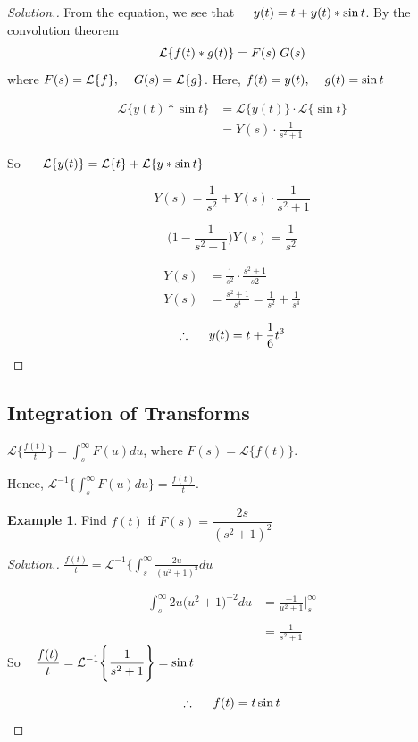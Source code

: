\documentclass[11pt,a4paper]{article}
\theoremstyle{definition}
\newtheorem{exa}[thm]{Example}
\newenvironment{solution}
  {\renewcommand{\qedsymbol}{}\begin{proof}[\textit{Solution}.]}
  {\end{proof}}
\begin{document}
\begin{solution}


From the equation, we see that $\hspace{0.4cm} y(t) = t + y(t)*\sin t$. By the convolution theorem $$\mathcal{L}\{f(t)*g(t)\} = F(s)\hspace{0.1cm} G(s)$$
where $F(s) = \mathcal{L}\{f\},\hspace{0.4cm} G(s) = \mathcal{L}\{g\}$.
Here, $f(t) = y(t),\hspace{0.4cm} g(t) = \sin t$

\begin{align*}
\mathcal{L}\{y(t)*\sin t\} & = \mathcal{L}\{y(t)\}\cdot\mathcal{L}\{\sin t\}\\
& = Y(s)\cdot \frac{1}{s^2 + 1}
\end{align*}

So $\hspace{0.5cm}\displaystyle{\mathcal{L}\{y(t)\} = \mathcal{L}\{t\} + \mathcal{L}\{y*\sin t\}}$

$$Y(s) =\frac{1}{s^2} + Y(s)\cdot\frac{1}{s^2 + 1}$$

$$\Bigg(1 - \frac{1}{s^2 + 1}\Bigg) Y(s) = \frac{1}{s^2}$$

\begin{align*}
Y(s) & = \frac{1}{s^2}\cdot \frac{s^2 + 1}{s2}\\
Y(s) & = \frac{s^2 + 1}{s^4} = \frac{1}{s^2} + \frac{1}{s^4}
\end{align*}

$$\therefore\hspace{0.5cm} y(t) = t + \frac{1}{6}t^3$$
\end{solution}


{\color[wave]{485}\subsection{Integration of Transforms}}
$\displaystyle{\mathcal{L}\Bigg\{\frac{f(t)}{t}\Bigg\}=\int^{\infty}_s F(u)du}$, where $F(s) = \mathcal{L}\{f(t)\}$.


Hence, $\displaystyle{\mathcal{L}^{-1}\Bigg\{\int^{\infty}_s F(u)du\Bigg\} = \frac{f(t)}{t}}$.


\begin{exa}


Find $f(t)$ if $F(s) = \dfrac{2s}{(s^2 + 1)^2}$
\end{exa}


\begin{solution}
$\displaystyle{\frac{f(t)}{t} = \mathcal{L}^{-1}\Bigg\{\int^{\infty}_s \frac{2u}{(u^2 + 1)^2}du}$

\begin{align*}
\int^{\infty}_s 2u\big(u^2 + 1\big)^{-2}du & = \frac{-1}{u^2 + 1}\Bigg|^{\infty}_s\\\\
& = \frac{1}{s^2 + 1}
\end{align*}
So $\hspace{0.3cm}\displaystyle{\frac{f(t)}{t}=\mathcal{L}^{-1}\Bigg\{\frac{1}{s^2 + 1}\Bigg\}=\sin t}$

$$\therefore\hspace{0.5cm} f(t) = t \sin t$$
\end{solution}
\end{document}
